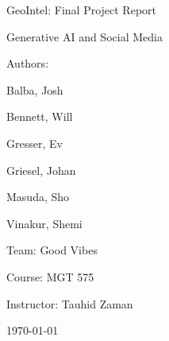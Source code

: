 \begin{titlepage}
  \centering
  {\LARGE GeoIntel: Final Project Report\par}
  \vspace{1.5cm}
  {\large Generative AI and Social Media\par}
  \vspace{1cm}

  {\large Authors:\par}
  {\large Balba, Josh\par}
  {\large Bennett, Will\par}
  {\large Gresser, Ev\par}
  {\large Griesel, Johan\par}
  {\large Masuda, Sho\par}
  {\large Vinakur, Shemi\par}
  \vspace{0.5cm}
  {\large Team: Good Vibes\par}
  {\large Course: MGT 575\par}
  {\large Instructor: Tauhid Zaman\par}
  \vspace{1.5cm}

  {\large \today\par}
\end{titlepage}
